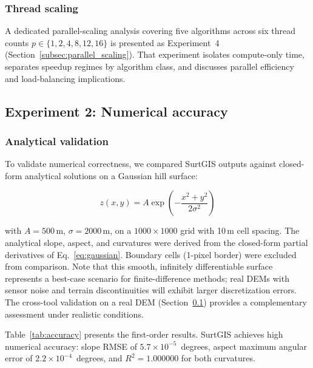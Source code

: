 \documentclass[preprint,review,12pt,authoryear]{elsarticle}
\begin{document}
\subsubsection{Thread scaling}

A dedicated parallel-scaling analysis covering five algorithms across six thread counts $p \in \{1, 2, 4, 8, 12, 16\}$ is presented as Experiment~4 (Section~\ref{subsec:parallel_scaling}). That experiment isolates compute-only time, separates speedup regimes by algorithm class, and discusses parallel efficiency and load-balancing implications.

\subsection{Experiment 2: Numerical accuracy}
\label{subsec:accuracy}

\subsubsection{Analytical validation}

To validate numerical correctness, we compared SurtGIS outputs against closed-form analytical solutions on a Gaussian hill surface:

\begin{equation}
z(x,y) = A \exp\!\left(-\frac{x^2 + y^2}{2\sigma^2}\right)
\label{eq:gaussian}
\end{equation}

\noindent with $A = 500$\,m, $\sigma = 2000$\,m, on a $1000 \times 1000$ grid with 10\,m cell spacing. The analytical slope, aspect, and curvatures were derived from the closed-form partial derivatives of Eq.~\ref{eq:gaussian}. Boundary cells (1-pixel border) were excluded from comparison. Note that this smooth, infinitely differentiable surface represents a best-case scenario for finite-difference methods; real DEMs with sensor noise and terrain discontinuities will exhibit larger discretization errors. The cross-tool validation on a real DEM (Section~\ref{subsec:accuracy}) provides a complementary assessment under realistic conditions.

Table~\ref{tab:accuracy} presents the first-order results. SurtGIS achieves high numerical accuracy: slope RMSE of $5.7 \times 10^{-5}$~degrees, aspect maximum angular error of $2.2 \times 10^{-4}$~degrees, and $R^2 = 1.000000$ for both curvatures.
\end{document}
